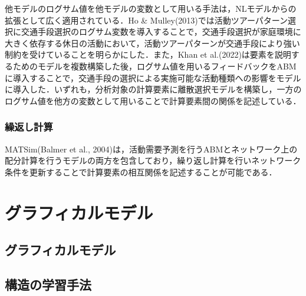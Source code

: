 他モデルのログサム値を他モデルの変数として用いる手法は，NLモデルからの拡張として広く適用されている．Ho \& Mulley(2013)では活動ツアーパターン選択に交通手段選択のログサム変数を導入することで，交通手段選択が家庭環境に大きく依存する休日の活動において，活動ツアーパターンが交通手段により強い制約を受けていることを明らかにした．また，Khan et al.(2022)は要素を説明するためのモデルを複数構築した後，ログサム値を用いるフィードバックをABMに導入することで，交通手段の選択による実施可能な活動種類への影響をモデルに導入した．いずれも，分析対象の計算要素に離散選択モデルを構築し，一方のログサム値を他方の変数として用いることで計算要素間の関係を記述している．

\subsubsection{繰返し計算}
MATSim(Balmer et al., 2004)は，活動需要予測を行うABMとネットワーク上の配分計算を行うモデルの両方を包含しており，繰り返し計算を行いネットワーク条件を更新することで計算要素の相互関係を記述することが可能である．


\section{グラフィカルモデル}\label{2.3}

\subsection{グラフィカルモデル}\label{2.3.1}

\subsection{構造の学習手法}\label{2.3.2}